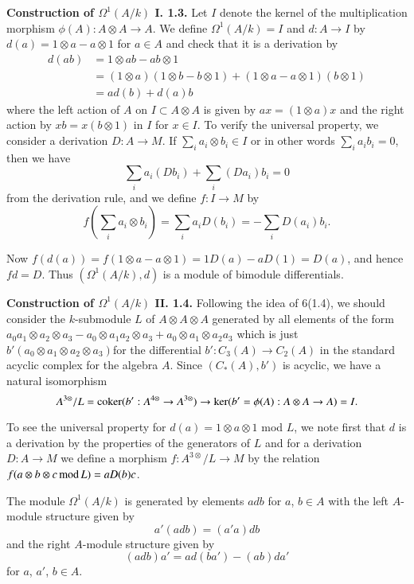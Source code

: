 \noindent
{\bf Construction of {\boldmath$\Omega^{1}(A/k)$} I. 1.3.} Let $I$
denote the kernel of the multiplication morphism $\phi(A):A\otimes
A\to A$. We define $\Omega^{1}(A/k)=I$ and $d:A\to I$ by
$d(a)=1\otimes a-a\otimes 1$ for $a\in A$ and check that it is a
derivation by
\begin{align*}
d(ab) &= 1\otimes ab-ab\otimes 1\\
&=(1\otimes a)(1\otimes b-b\otimes
1)+(1\otimes a-a\otimes 1)(b\otimes 1)\\
&= ad(b)+d(a)b
\end{align*}
where the left action of $A$ on $I\subset A\otimes A$ is given by
$ax=(1\otimes a)x$ and the right action by $xb=x(b\otimes 1)$ in $I$
for $x\in I$. To verify the universal property, we consider a
derivation $D:A\to M$. If $\sum_{i}a_{i}\otimes b_{i}\in I$ or in
other words $\sum_{i}a_{i}b_{i}=0$, then we have
$$
\sum_{i}a_{i}(Db_{i})+\sum_{i}(Da_{i})b_{i}=0
$$
from the derivation rule, and we define $f:I\to M$ by
$$
f\left(\sum_{i}a_{i}\otimes
b_{i}\right)=\sum_{i}a_{i}D(b_{i})=-\sum_{i}D(a_{i})b_{i}.
$$

Now $f(d(a))=f(1\otimes a-a\otimes 1)=1D(a)-aD(1)=D(a)$, and hence
$fd=D$. Thus $(\Omega^{1}(A/k),d)$ is a module of bimodule
differentials.

\medskip
\noindent
{\bf Construction of {\boldmath$\Omega^{1}(A/k)$} II. 1.4.}
Following the idea of 6(1.4), we should consider the $k$-submodule $L$
of $A\otimes A\otimes A$ generated by all elements of the form
$a_{0}a_{1}\otimes a_{2}\otimes a_{3}-a_{0}\otimes a_{1}a_{2}\otimes
a_{3}+a_{0}\otimes a_{1}\otimes a_{2}a_{3}$ which is just
$b'(a_{0}\otimes a_{1}\otimes a_{2}\otimes a_{3})$\pageoriginale for
the differential $b':C_{3}(A)\to C_{2}(A)$ in the standard acyclic
complex for the algebra $A$. Since $(C_{*}(A),b')$ is acyclic, we have
a natural isomorphism
$$
A^{3\otimes}/L=\operatorname{coker}(b':A^{4\otimes}\to A^{3\otimes})\to
\ker(b'=\phi(A):A\otimes A\to A)=I.
$$

To see the universal property for $d(a)=1\otimes a\otimes 1$ mod $L$,
we note first that $d$ is a derivation by the properties of the
generators of $L$ and for a derivation $D:A\to M$ we define a morphism
$f:A^{3\otimes}/L\to M$ by the relation $f(a\otimes b\otimes
c\text{\,mod\,}L)=aD(b)c$. 

\setcounter{theorem}{4}
\begin{remark}\label{chap7-rem1.5}
The module $\Omega^{1}(A/k)$ is generated by elements $adb$ for $a$,
$b\in A$ with the left $A$-module structure given by
$$
a'(adb)=(a'a)db
$$
and the right $A$-module structure given by
$$
(adb)a'=ad(ba')-(ab)da'
$$
for $a$, $a'$, $b\in A$.
\end{remark}

